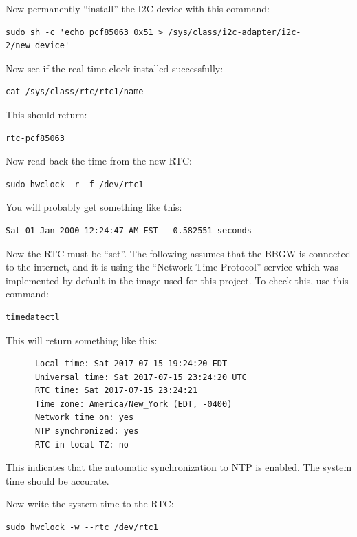 Now permanently ``install'' the I2C device with this command:

\begin{verbatim}
sudo sh -c 'echo pcf85063 0x51 > /sys/class/i2c-adapter/i2c-2/new_device'
\end{verbatim}

Now see if the real time clock installed successfully:

\begin{verbatim}
cat /sys/class/rtc/rtc1/name
\end{verbatim}

This should return:

\begin{verbatim}
rtc-pcf85063
\end{verbatim}

Now read back the time from the new RTC:

\begin{verbatim}
sudo hwclock -r -f /dev/rtc1
\end{verbatim}

You will probably get something like this:

\begin{verbatim}
Sat 01 Jan 2000 12:24:47 AM EST  -0.582551 seconds
\end{verbatim}

Now the RTC must be ``set''.  The following assumes that the BBGW is connected to the internet, and it is using the ``Network Time Protocol'' service which was implemented by default in the image used for this project.
To check this, use this command:

\begin{verbatim}
timedatectl
\end{verbatim}

This will return something like this:

\begin{verbatim}
      Local time: Sat 2017-07-15 19:24:20 EDT
      Universal time: Sat 2017-07-15 23:24:20 UTC
      RTC time: Sat 2017-07-15 23:24:21
      Time zone: America/New_York (EDT, -0400)
      Network time on: yes
      NTP synchronized: yes
      RTC in local TZ: no
\end{verbatim}

This indicates that the automatic synchronization to NTP is enabled.
The system time should be accurate.

Now write the system time to the RTC:

\begin{verbatim}
sudo hwclock -w --rtc /dev/rtc1
\end{verbatim}

